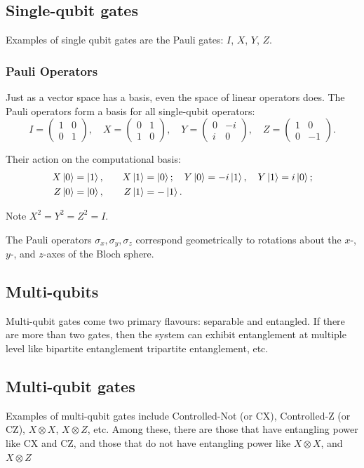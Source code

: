 \documentclass[12pt, a4paper, oneside]{report}
\theoremstyle{plain}
\theoremstyle{definition}
\theoremstyle{remark}
\begin{document}
\subsection{Single-qubit gates}
Examples of single qubit gates are the Pauli gates: $I$, $X$, $Y$, $Z$.
\subsubsection{Pauli Operators}

Just as a vector space has a basis, even the space of linear operators does. The Pauli operators form a basis for all single-qubit operators:
\[
	I = \begin{pmatrix}1&0\\0&1\end{pmatrix},\quad
	X = \begin{pmatrix}0&1\\1&0\end{pmatrix},\quad
	Y = \begin{pmatrix}0&-i\\i&0\end{pmatrix},\quad
	Z = \begin{pmatrix}1&0\\0&-1\end{pmatrix}.
\]

Their action on the computational basis:
\begin{alignat*}{2}
	X\ket{0} & = \ket{1}, & \quad X\ket{1} & = \ket{0};\quad
	Y\ket{0} = -i\ket{1}, \quad Y\ket{1} = i\ket{0};         \\
	Z\ket{0} & = \ket{0}, & \quad Z\ket{1} & = -\ket{1}.
\end{alignat*}

Note $X^2 = Y^2 = Z^2 = I$.

The Pauli operators $\sigma_x, \sigma_y, \sigma_z$ correspond geometrically to rotations about the $x$-, $y$-, and $z$-axes of the Bloch sphere.

\subsection{Multi-qubits}
Multi-qubit gates come two primary flavours: separable and entangled. If there are more than two gates, then the system can exhibit entanglement at multiple level like bipartite entanglement tripartite entanglement, etc.
\subsection{Multi-qubit gates}
Examples of multi-qubit gates include Controlled-Not (or CX), Controlled-Z (or CZ), $X \otimes X$, $X \otimes Z$, etc. Among these, there are those that have entangling power like CX and CZ, and those that do not have entangling power like $X \otimes X$, and $X \otimes Z$
\end{document}
